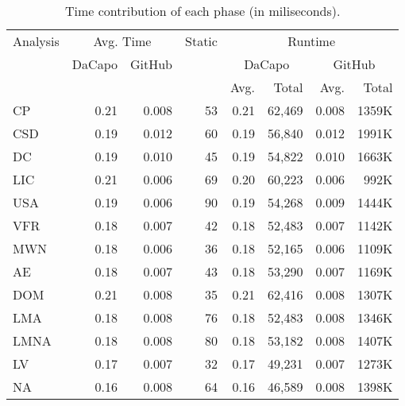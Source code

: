 \begin{table}
	\centering
	\scriptsize
	\caption{Time contribution of each phase (in miliseconds).}
\setlength{\tabcolsep}{4.5pt}
\begin{tabular}{rrrrrrrr}
\toprule
Analysis & \multicolumn{2}{c}{Avg. Time} & Static & \multicolumn{4}{c}{Runtime} \\
\cmidrule(lr){2-3} \cmidrule(lr){5-8}      & DaCapo & GitHub &       & \multicolumn{2}{c}{DaCapo} & \multicolumn{2}{c}{GitHub} \\
\cmidrule(lr){5-6} \cmidrule(lr){7-8}      &       &       &       & Avg.  & Total & Avg.  & Total \\
\midrule
\multicolumn{1}{l}{CP} & 0.21 &    0.008   &       53  &   0.21    &  62,469     &    0.008   & 1359K \\
\multicolumn{1}{l}{CSD} & 0.19 &  0.012     &       60  &     0.19  &   56,840    &   0.012    &  1991K \\
\multicolumn{1}{l}{DC} & 0.19 &   0.010    &       45  &    0.19   &  54,822     &   0.010    &  1663K \\
\multicolumn{1}{l}{LIC} & 0.21 &  0.006     &       69  &    0.20   &    60,223   &    0.006   &  992K \\
\multicolumn{1}{l}{USA} & 0.19 &   0.006    &       90  &   0.19    &   54,268    &  0.009     &  1444K \\
\multicolumn{1}{l}{VFR} & 0.18 &    0.007   &       42  &   0.18    &     52,483  &   0.007    &  1142K \\
\multicolumn{1}{l}{MWN} & 0.18 &    0.006   &       36  &   0.18    &     52,165  &   0.006    &  1109K \\
\multicolumn{1}{l}{AE} & 0.18 &    0.007   &       43  &   0.18    &     53,290  &   0.007    &  1169K \\
\multicolumn{1}{l}{DOM} & 0.21 &    0.008   &       35  &    0.21   &    62,416    &  0.008     &  1307K \\
\multicolumn{1}{l}{LMA} & 0.18 &    0.008   &       76  &   0.18    &     52,483  &   0.008    &  1346K \\
\multicolumn{1}{l}{LMNA} & 0.18 &    0.008   &       80  &     0.18  &   53,182    &  0.008     &  1407K\\
\multicolumn{1}{l}{LV} & 0.17 &   0.007    &       32  &    0.17   &     49,231  &   0.007    &  1273K\\
\multicolumn{1}{l}{NA} & 0.16 &   0.008    &       64  & 0.16      &    46,589   &   0.008    &  1398K\\

\end{tabular}
\end{table}
